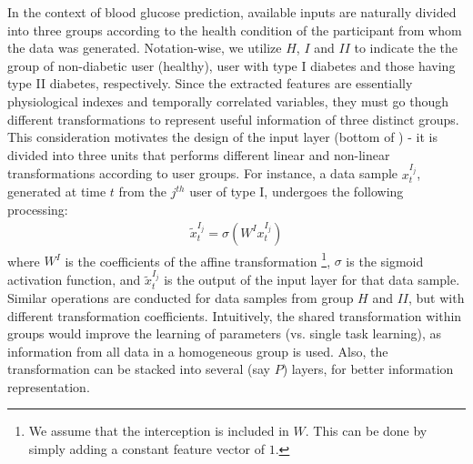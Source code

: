 In the context of blood glucose prediction, available inputs are naturally divided into three groups according to the health condition of the participant from whom the data was generated.
Notation-wise, we utilize $H$, $I$ and $II$ to indicate the the group of non-diabetic user (healthy), user with type I diabetes and those having type II diabetes, respectively.
Since the extracted features are essentially physiological indexes and temporally correlated variables, they must go though different transformations to represent useful information of three distinct groups.
This consideration motivates the design of the input layer (bottom of ) - it is divided into three units that performs different linear and non-linear transformations according to user groups.
For instance, a data sample $x_t^{I_j}$, generated at time $t$ from the $j^{th}$ user of type I, undergoes the following processing:
\begin{align}
\tilde{x}_t^{I_j} = \sigma \left( W^Ix_t^{I_j} \right)
\end{align}
where $W^I$ is the coefficients of the affine transformation \footnote{We assume that the interception is included in $W$. This can be done by simply adding a constant feature vector of $1$.}, $\sigma$ is the sigmoid activation function, and $\tilde{x}_t^{I_j}$ is the output of the input layer for that data sample.
Similar operations are conducted for data samples from group $H$ and $II$, but with different transformation coefficients.
Intuitively, the shared transformation within groups would improve the learning of parameters (vs. single task learning), as information from all data in a homogeneous group is used.
Also, the transformation can be stacked into several (say $P$) layers, for better information representation.

